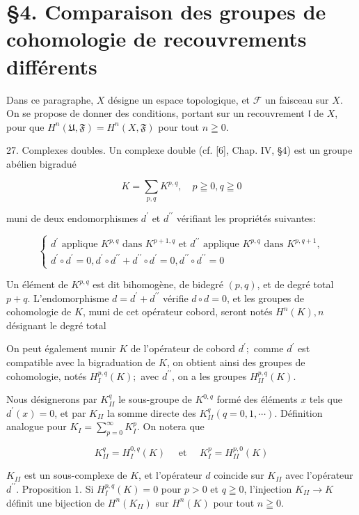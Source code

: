 \section{§4. Comparaison des groupes de cohomologie de recouvrements différents}

Dans ce paragraphe, $X$ désigne un espace topologique, et $\mathcal{F}$ un faisceau sur $X .$ On se propose de donner des conditions, portant sur un recouvrement $\mathfrak{l}$ de $X$, pour que $H^{n}(\mathfrak{U}, \mathfrak{F})=H^{n}(X, \mathfrak{F})$ pour tout $n \geqq 0$.

27. Complexes doubles. Un complexe double (cf. [6], Chap. IV, §4) est un groupe abélien bigradué

$$
K=\sum_{p, q} K^{p, q}, \quad p \geqq 0, q \geqq 0
$$

muni de deux endomorphismes $d^{\prime}$ et $d^{\prime \prime}$ vérifiant les propriétés suivantes:

$$
\left\{\begin{array}{l}
    d^{\prime} \text { applique } K^{p, q} \text { dans } K^{p+1, q} \text { et } d^{\prime \prime} \text { applique } K^{p, q} \text { dans } K^{p, q+1}, \\
    d^{\prime} \circ d^{\prime}=0, d^{\prime} \circ d^{\prime \prime}+d^{\prime \prime} \circ d^{\prime}=0, d^{\prime \prime} \circ d^{\prime \prime}=0
\end{array}\right.
$$

Un élément de $K^{p, q}$ est dit bihomogène, de bidegré $(p, q)$, et de degré total $p+q .$ L'endomorphisme $d=d^{\prime}+d^{\prime \prime}$ vérifie $d \circ d=0$, et les groupes de cohomologie de $K$, muni de cet opérateur cobord, seront notés $H^{n}(K), n$ désignant le degré total

On peut également munir $K$ de l'opérateur de cobord $d^{\prime} ;$ comme $d^{\prime}$ est compatible avec la bigraduation de $K$, on obtient ainsi des groupes de cohomologie, notés $H_{I}^{p, q}(K) ;$ avec $d^{\prime \prime}$, on a les groupes $H_{I I}^{p, q}(K)$.

Nous désignerons par $K_{I I}^{q}$ le sous-groupe de $K^{0, q}$ formé des éléments $x$ tels que $d^{\prime}(x)=0$, et par $K_{I I}$ la somme directe des $K_{I I}^{q}(q=0,1, \cdots) .$ Définition analogue pour $K_{I}=\sum_{p=0}^{\infty} K_{I}^{p} .$ On notera que

$$
K_{I I}^{q}=H_{I}^{0, q}(K) \quad \text { et } \quad K_{I}^{p}=H_{I I}^{p, 0}(K)
$$

$K_{I I}$ est un sous-complexe de $K$, et l'opérateur $d$ coincide sur $K_{I I}$ avec l'opérateur $d^{\prime \prime}$. Proposition 1. Si $H_{I}^{p, q}(K)=0$ pour $p>0$ et $q \geqq 0$, l'injection $K_{I I} \rightarrow K$ définit une bijection de $H^{n}\left(K_{I I}\right)$ sur $H^{n}(K)$ pour tout $n \geqq 0$.

